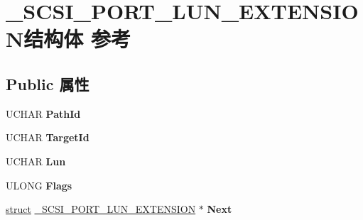 \hypertarget{struct___s_c_s_i___p_o_r_t___l_u_n___e_x_t_e_n_s_i_o_n}{}\section{\+\_\+\+S\+C\+S\+I\+\_\+\+P\+O\+R\+T\+\_\+\+L\+U\+N\+\_\+\+E\+X\+T\+E\+N\+S\+I\+O\+N结构体 参考}
\label{struct___s_c_s_i___p_o_r_t___l_u_n___e_x_t_e_n_s_i_o_n}
\subsection*{Public 属性}
\begin{DoxyCompactItemize}
\item 
\mbox{\label{struct___s_c_s_i___p_o_r_t___l_u_n___e_x_t_e_n_s_i_o_n_a9860afbb3912cb1f238c4f38dd6c9c5a}} 
U\+C\+H\+AR {\bfseries Path\+Id}
\item 
\mbox{\label{struct___s_c_s_i___p_o_r_t___l_u_n___e_x_t_e_n_s_i_o_n_a5ced075152541efbbb90d85f1ccaaa19}} 
U\+C\+H\+AR {\bfseries Target\+Id}
\item 
\mbox{\label{struct___s_c_s_i___p_o_r_t___l_u_n___e_x_t_e_n_s_i_o_n_a1916961ed76c521be37b4dff7380457d}} 
U\+C\+H\+AR {\bfseries Lun}
\item 
\mbox{\label{struct___s_c_s_i___p_o_r_t___l_u_n___e_x_t_e_n_s_i_o_n_a16d98283e0986491b8567f57b8bd9f4d}} 
U\+L\+O\+NG {\bfseries Flags}
\item 
\mbox{\label{struct___s_c_s_i___p_o_r_t___l_u_n___e_x_t_e_n_s_i_o_n_a7cb11aac38e9c2e1ee578ae95f76abc4}} 
\hyperlink{interfacestruct}{struct} \hyperlink{struct___s_c_s_i___p_o_r_t___l_u_n___e_x_t_e_n_s_i_o_n}{\+\_\+\+S\+C\+S\+I\+\_\+\+P\+O\+R\+T\+\_\+\+L\+U\+N\+\_\+\+E\+X\+T\+E\+N\+S\+I\+ON} $\ast$ {\bfseries Next}
\item 
\mbox{\label{struct___s_c_s_i___p_o_r_t___l_u_n___e_x_t_e_n_s_i_o_n_ad3127ce8a8addade703dc40896366525}} 

\end{DoxyCompactItemize}
